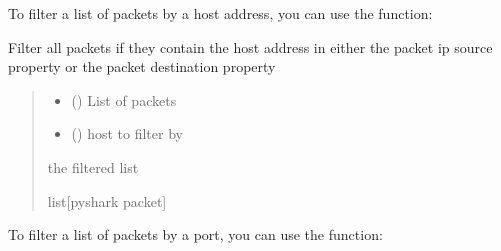 \documentclass[letterpaper,10pt,english,openany,oneside]{sphinxmanual}
\begin{document}
\sphinxAtStartPar
To filter a list of packets by a host address, you can
use the  function:

\begin{fulllineitems}
\label{\detokenize{index:pktsniffer.filter_by_host}}
\pysigstartsignatures
\pysiglinewithargsret
{}
{\sphinxparamcomma {}}
{}
\pysigstopsignatures
\sphinxAtStartPar
Filter all packets if they contain the host address in either the
packet ip source property or the packet destination property
\begin{quote}\begin{description}
\begin{itemize}
\item {} 
\sphinxAtStartPar
{} (\sphinxstyleliteralemphasis{\sphinxupquote{{[}}}\sphinxstyleliteralemphasis{\sphinxupquote{{]}}}) \textendash{} List of packets

\item {} 
\sphinxAtStartPar
{} () \textendash{} host to filter by

\end{itemize}

\sphinxAtStartPar
the filtered list

\sphinxAtStartPar
list{[}pyshark packet{]}

\end{description}\end{quote}

\end{fulllineitems}


\sphinxAtStartPar
To filter a list of packets by a port, you can
use the  function:
\end{document}

